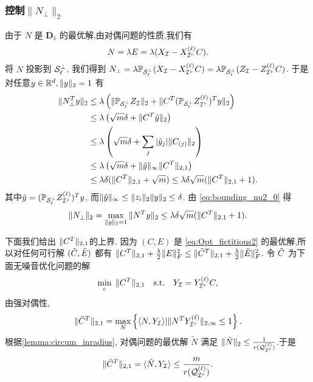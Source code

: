 \subsubsection{控制\(\|N_{\perp}\|_2\)}
由于 \(N\) 是 \(\mathbf{D}_1\) 的最优解,由对偶问题的性质,我们有
\[ N=\lambda E=\lambda(X_{\mathcal{I}}-X^{(\ell)}_{\mathcal{I}^c}C). \]
将 \(N\) 投影到 \(\mathcal{S}^{\perp}_{\ell}\), 我们得到
\(N_{\perp}=\lambda \mathbb{P}_{\mathcal{S}_{\ell}^{\perp}}(X_{\mathcal{I}}-X^{(\ell)}_{\mathcal{I}^c}C)
= \lambda \mathbb{P}_{\mathcal{S}_{\ell}^{\perp}}(Z_{\mathcal{I}}-Z^{(\ell)}_{\mathcal{I}^c}C)\).
于是对任意\(y\in \mathbb{R}^d, \|y\|_2=1\) 有
\begin{align}
  \|N_{\perp}^T y\|_2 & \leq\lambda \left(\|\mathbb{P}_{\mathcal{S}_{\ell}^{\perp}}Z_{\mathcal{I}}\|_2
  +\|C^T (\mathbb{P}_{\mathcal{S}_{\ell}^{\perp}}Z^{(\ell)}_{\mathcal{I}^c})^T y\|_2\right)\nonumber\\
  & \leq \lambda\left( \sqrt{m} \delta + \|C^T \tilde{y}\|_2\right) \nonumber\\
  & \leq \lambda\left( \sqrt{m} \delta + \sum_j |\tilde{y}_j|\|C_{(j)}\|_2\right) \nonumber\\
  & \leq \lambda\left( \sqrt{m} \delta + \|\tilde{y}\|_{\infty}\|C^T\|_{2,1}\right) \nonumber\\
  & \leq \lambda \delta(\|C^T\|_{2,1}+\sqrt{m}) \leq \lambda\delta\sqrt{m}(\|C^T\|_{2,1}+1).
  \label{eq:bounding_nu2_0}
\end{align}
其中\(\tilde{y}=(\mathbb{P}_{\mathcal{S}_{\ell}^{\perp}}Z^{(\ell)}_{\mathcal{I}^c})^Ty\),
而\(\|\tilde{y}\|_\infty \leq \|z_i\|_2 \|y\|_2 \leq
\delta\). 由 \eqref{eq:bounding_nu2_0} 得
\begin{equation}
  \|N_{\perp}\|_2 = \max_{\|y\|_2=1} \|N^T y\|_2 \le \lambda\delta\sqrt{m}(\|C^T\|_{2,1}+1).
  \label{eq:bounding_nu2}
\end{equation}

下面我们给出 \(\|C^T\|_{2,1}\)的上界.
因为 \((C,E)\) 是 \eqref{eq:Opt_fictitious2} 的最优解,所以对任何可行解 \((\tilde{C} ,\tilde{E})\)
都有 \(\|C^T\|_{2,1}+\frac{\lambda}{2}\|E\|^2_F \leq \|\tilde{C}^T\|_{2,1}+\frac{\lambda}{2}\|\tilde{E}\|_F^2\).
令 \(\tilde{C}\) 为下面无噪音优化问题的解
\begin{align}\label{eq:Opt_y only}
\min_{c} \; \|C^T\|_{2,1} \quad
\text{s.t.} \quad Y_{\mathcal{I}}=Y^{(\ell)}_{\mathcal{I}^c}C,
\end{align}
由强对偶性,
\[\|\tilde{C}^T\|_{2,1} = \max_{N}\left\{\langle N,Y_{\mathcal{I}}\rangle | \|N^T
Y^{(\ell)}_{\mathcal{I}^c}\|_{2, \infty}\leq 1\right\}.\]
根据\autoref{lemma:circum_inradius},   对偶问题的最优解 \(\tilde{N}\) 满足
\(\|\tilde{N}\|_2 \leq \frac{1}{r(\mathcal{Q}_{\mathcal{I}^c}^{(\ell)})}\).于是
\[\|\tilde{C}^T\|_{2,1} = \langle\tilde{N},Y_{\mathcal{I}}\rangle \leq
\frac{m}{r(\mathcal{Q}_{\mathcal{I}^c}^{(\ell)})}.\]

